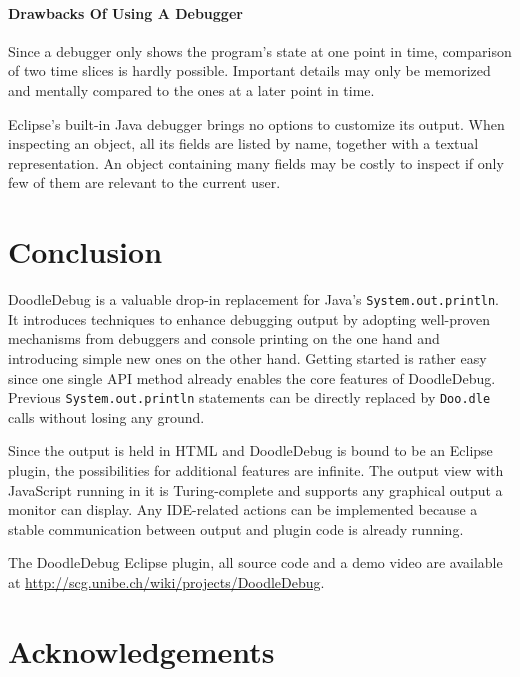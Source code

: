 \documentclass[english]{scrartcl}
\newcommand{\DD}{Dood\-le\-De\-bug\xspace}
\newcommand{\Doodle}{\texttt{Doo.\-dle}\xspace}
\newcommand{\println}{\texttt{Sys\-tem.\-out.\-println}\xspace}
\begin{document}
\paragraph{Drawbacks Of Using A Debugger}
Since a debugger only shows the program's state at one point in time, comparison of two time slices is hardly possible.
Important details may only be memorized and mentally compared to the ones at a later point in time.

Eclipse's built-in Java debugger brings no options to customize its output.
When inspecting an object, all its fields are listed by name, together with a textual representation.
An object containing many fields may be costly to inspect if only few of them are relevant to the current user.


\section{Conclusion}
\DD is a valuable drop-in replacement for Java's \println.
It introduces techniques to enhance debugging output by adopting well-proven mechanisms from debuggers and console printing on the one hand and introducing simple new ones on the other hand.
Getting started is rather easy since one single API method already enables the core features of \DD.
Previous \println statements can be directly replaced by \Doodle calls without losing any ground.

Since the output is held in HTML and \DD is bound to be an Eclipse plugin, the possibilities for additional features are infinite.
The output view with JavaScript running in it is Turing-complete and supports any graphical output a monitor can display.
Any IDE-related actions can be implemented because a stable communication between output and plugin code is already running.

The DoodleDebug Eclipse plugin, all source code and a demo video are available at \url{http://scg.unibe.ch/wiki/projects/DoodleDebug}.

\section{Acknowledgements}



{}
\end{document}

